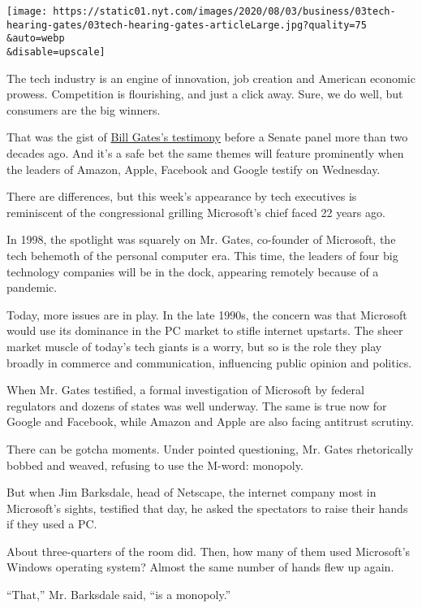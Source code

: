 \texttt{[image: https://static01.nyt.com/images/2020/08/03/business/03tech-hearing-gates/03tech-hearing-gates-articleLarge.jpg?quality=75\\\&auto=webp\\\&disable=upscale]}

The tech industry is an engine of innovation, job creation and American
economic prowess. Competition is flourishing, and just a click away.
Sure, we do well, but consumers are the big winners.

That was the gist of
\href{https://archive.nytimes.com/www.nytimes.com/library/tech/98/03/biztech/articles/04microsoft.html}{Bill
Gates's testimony} before a Senate panel more than two decades ago. And
it's a safe bet the same themes will feature prominently when the
leaders of Amazon, Apple, Facebook and Google testify on Wednesday.

There are differences, but this week's appearance by tech executives is
reminiscent of the congressional grilling Microsoft's chief faced 22
years ago.

In 1998, the spotlight was squarely on Mr. Gates, co-founder of
Microsoft, the tech behemoth of the personal computer era. This time,
the leaders of four big technology companies will be in the dock,
appearing remotely because of a pandemic.

Today, more issues are in play. In the late 1990s, the concern was that
Microsoft would use its dominance in the PC market to stifle internet
upstarts. The sheer market muscle of today's tech giants is a worry, but
so is the role they play broadly in commerce and communication,
influencing public opinion and politics.

When Mr. Gates testified, a formal investigation of Microsoft by federal
regulators and dozens of states was well underway. The same is true now
for Google and Facebook, while Amazon and Apple are also facing
antitrust scrutiny.

There can be gotcha moments. Under pointed questioning, Mr. Gates
rhetorically bobbed and weaved, refusing to use the M-word: monopoly.

But when Jim Barksdale, head of Netscape, the internet company most in
Microsoft's sights, testified that day, he asked the spectators to raise
their hands if they used a PC.

About three-quarters of the room did. Then, how many of them used
Microsoft's Windows operating system? Almost the same number of hands
flew up again.

``That,'' Mr. Barksdale said, ``is a monopoly.''

